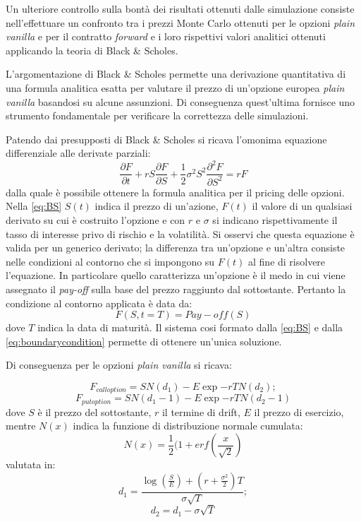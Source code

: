 Un ulteriore controllo sulla bontà dei risultati ottenuti dalle simulazione consiste nell'effettuare un confronto tra i prezzi Monte Carlo ottenuti per le opzioni \textit{plain vanilla} e per il contratto \textit{forward} e i loro rispettivi valori analitici ottenuti applicando la teoria di Black \& Scholes. 

L'argomentazione di Black \& Scholes permette una derivazione quantitativa di una formula analitica esatta per valutare il prezzo di un'opzione europea \textit{plain vanilla} basandosi su alcune assunzioni. Di conseguenza quest'ultima fornisce uno strumento fondamentale per verificare la correttezza delle simulazioni.

Patendo dai presupposti di Black \& Scholes si ricava l'omonima equazione differenziale alle derivate parziali:
\begin{equation}
    \frac{\partial F}{\partial t} + rS \frac{\partial F}{\partial S} + \frac{1}{2} \sigma ^2 S ^2 \frac{\partial ^2 F}{\partial S^2} = r F
    \label{eq:BS}
\end{equation}
dalla quale è possibile ottenere la formula analitica per il pricing delle opzioni. Nella \ref{eq:BS} $S(t)$ indica il prezzo di un'azione, $F(t)$ il valore di un qualsiasi derivato su cui è costruito l'opzione e con $r$ e $\sigma$ si indicano rispettivamente il tasso di interesse privo di rischio e la volatilità. Si osservi che questa equazione è valida per un generico derivato; la differenza tra un'opzione e un'altra consiste nelle condizioni al contorno che si impongono su $F(t)$ al fine di risolvere l'equazione. In particolare quello caratterizza un'opzione è il medo in cui viene assegnato il \textit{pay-off} sulla base del prezzo raggiunto dal sottostante. Pertanto la condizione al contorno applicata è data da:
\begin{equation}
    F(S,t=T) = Pay-off(S)
    \label{eq:boundarycondition}
\end{equation}
dove $T$ indica la data di maturità.
Il sistema cosi formato dalla \ref{eq:BS} e dalla \ref{eq:boundarycondition} permette di ottenere un'unica soluzione.

Di conseguenza per le opzioni \textit{plain vanilla} si ricava:

\begin{equation}
    F_{call option} = S N(d_{1}) - E \exp{- r T} N(d_{2});
\end{equation}
\begin{equation}
    F_{put option} = S N(d_{1}-1) - E \exp{- r T} N(d_{2}-1)
\end{equation}
dove $S$ è il prezzo del sottostante, $r$ il termine di drift, $E$ il prezzo di esercizio, mentre $N(x)$ indica la funzione di distribuzione normale cumulata:
\begin{equation}
    N(x)= \frac{1}{2}
    (1+erf(\frac{x}{\sqrt{2}})
\end{equation}
valutata in:
\begin{equation}
    d_{1}=\frac{\log(\frac{S}{E}) + (r+\frac{\sigma ^2}{2}) T}{\sigma \sqrt{T}};
\end{equation}
\begin{equation}
    d_{2}=d_{1}- \sigma \sqrt{T}
\end{equation}

